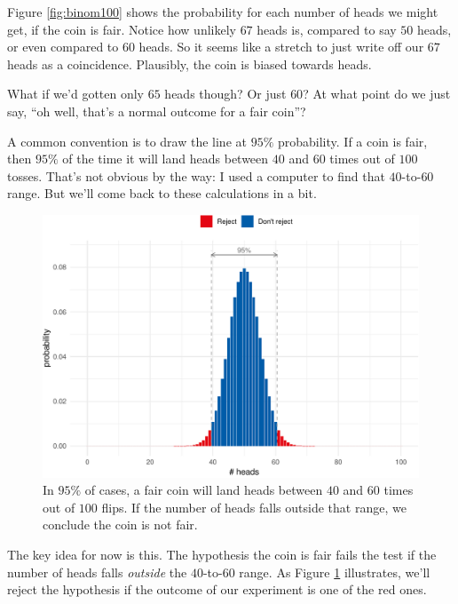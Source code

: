 \documentclass[justified]{tufte-book}
\theoremstyle{definition}
\theoremstyle{definition}
\theoremstyle{definition}
\theoremstyle{remark}
\begin{document}
Figure \ref{fig:binom100} shows the probability for each number of heads
we might get, if the coin is fair. Notice how unlikely \(67\) heads is,
compared to say \(50\) heads, or even compared to \(60\) heads. So it
seems like a stretch to just write off our \(67\) heads as a
coincidence. Plausibly, the coin is biased towards heads.

What if we'd gotten only \(65\) heads though? Or just \(60\)? At what
point do we just say, ``oh well, that's a normal outcome for a fair
coin''?

A common convention is to draw the line at \(95\%\) probability. If a
coin is fair, then \(95\%\) of the time it will land heads between
\(40\) and \(60\) times out of \(100\) tosses. That's not obvious by the
way: I used a computer to find that \(40\)-to-\(60\) range. But we'll
come back to these calculations in a bit.

\begin{figure}
\includegraphics{_main_files/figure-latex/binom100fences-1} \caption[In $95\%$ of cases, a fair coin will land heads between $40$ and $60$ times out of $100$ flips]{In $95\%$ of cases, a fair coin will land heads between $40$ and $60$ times out of $100$ flips. If the number of heads falls outside that range, we conclude the coin is not fair.}\label{fig:binom100fences}
\end{figure}

The key idea for now is this. The hypothesis the coin is fair fails the
test if the number of heads falls \emph{outside} the \(40\)-to-\(60\)
range. As Figure \ref{fig:binom100fences} illustrates, we'll reject the
hypothesis if the outcome of our experiment is one of the red ones.
\end{document}
